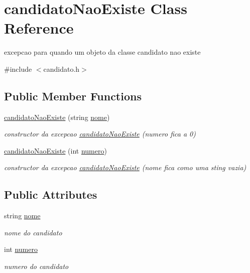 \hypertarget{classcandidatoNaoExiste}{}\section{candidato\+Nao\+Existe Class Reference}
\label{classcandidatoNaoExiste}


excepcao para quando um objeto da classe candidato nao existe  




{\ttfamily \#include $<$candidato.\+h$>$}

\subsection*{Public Member Functions}
\begin{DoxyCompactItemize}
\item 
\hyperlink{classcandidatoNaoExiste_a9716e1f8f12b959d9b39960a910b01c0}{candidato\+Nao\+Existe} (string \hyperlink{classcandidatoNaoExiste_ab70d4089271ae514955830e9248fa949}{nome})
\begin{DoxyCompactList}\small\item\em constructor da excepcao \hyperlink{classcandidatoNaoExiste}{candidato\+Nao\+Existe} (numero fica a 0) \end{DoxyCompactList}\item 
\hyperlink{classcandidatoNaoExiste_aa8c3f417e63efde5600f349550b0ad04}{candidato\+Nao\+Existe} (int \hyperlink{classcandidatoNaoExiste_ad5cd0ceebd377811c307f17070700a40}{numero})
\begin{DoxyCompactList}\small\item\em constructor da excepcao \hyperlink{classcandidatoNaoExiste}{candidato\+Nao\+Existe} (nome fica como uma sting vazia) \end{DoxyCompactList}\end{DoxyCompactItemize}
\subsection*{Public Attributes}
\begin{DoxyCompactItemize}
\item 
string \hyperlink{classcandidatoNaoExiste_ab70d4089271ae514955830e9248fa949}{nome}
\begin{DoxyCompactList}\small\item\em nome do candidato \end{DoxyCompactList}\item 
int \hyperlink{classcandidatoNaoExiste_ad5cd0ceebd377811c307f17070700a40}{numero}
\begin{DoxyCompactList}\small\item\em numero do candidato \end{DoxyCompactList}\end{DoxyCompactItemize}


